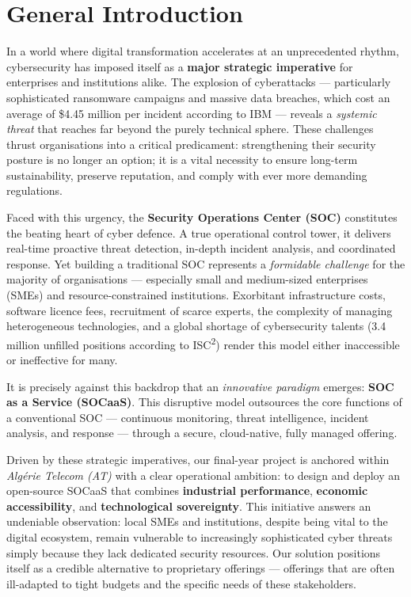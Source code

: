 \chapter{General Introduction}
\label{chap:general-introduction}

In a world where digital transformation accelerates at an unprecedented rhythm, cybersecurity has imposed itself as a \textbf{major strategic imperative} for enterprises and institutions alike. The explosion of cyberattacks --- particularly sophisticated ransomware campaigns and massive data breaches, which cost an average of \$4.45 million per incident according to IBM --- reveals a \textit{systemic threat} that reaches far beyond the purely technical sphere. These challenges thrust organisations into a critical predicament: strengthening their security posture is no longer an option; it is a vital necessity to ensure long-term sustainability, preserve reputation, and comply with ever more demanding regulations.

Faced with this urgency, the \textbf{Security Operations Center (SOC)} constitutes the beating heart of cyber defence. A true operational control tower, it delivers real-time proactive threat detection, in-depth incident analysis, and coordinated response. Yet building a traditional SOC represents a \textit{formidable challenge} for the majority of organisations --- especially small and medium-sized enterprises (SMEs) and resource-constrained institutions. Exorbitant infrastructure costs, software licence fees, recruitment of scarce experts, the complexity of managing heterogeneous technologies, and a global shortage of cybersecurity talents (3.4 million unfilled positions according to ISC\textsuperscript{2}) render this model either inaccessible or ineffective for many.

It is precisely against this backdrop that an \textit{innovative paradigm} emerges: \textbf{SOC as a Service (SOCaaS)}. This disruptive model outsources the core functions of a conventional SOC --- continuous monitoring, threat intelligence, incident analysis, and response --- through a secure, cloud-native, fully managed offering.

Driven by these strategic imperatives, our final-year project is anchored within \textit{Algérie Telecom (AT)} with a clear operational ambition: to design and deploy an open-source SOCaaS that combines \textbf{industrial performance}, \textbf{economic accessibility}, and \textbf{technological sovereignty}. This initiative answers an undeniable observation: local SMEs and institutions, despite being vital to the digital ecosystem, remain vulnerable to increasingly sophisticated cyber threats simply because they lack dedicated security resources. Our solution positions itself as a credible alternative to proprietary offerings --- offerings that are often ill-adapted to tight budgets and the specific needs of these stakeholders.

